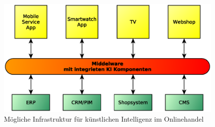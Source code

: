 \begin{figure}[!ht]
	\centering
	\includegraphics[width=\linewidth]{images/ecommerce-eco-system.eps}
	\caption{Mögliche Infrastruktur für künstlichen Intelligenz im Onlinehandel}
	\label{img:infrastructor_for_ai_in_e__commerce}
\end{figure}
